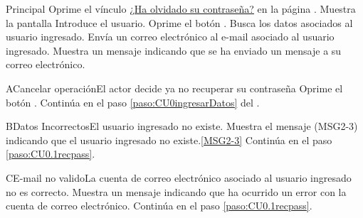	\begin{UCtrayectoria}{Principal}
			\UCpaso[\UCactor] Oprime el vínculo \underline{¿Ha olvidado su contraseña?} en la página .
			\UCpaso Muestra la pantalla 	
			\UCpaso [\UCactor] Introduce el usuario.\label{paso:CU0.1recpass}
			\UCpaso [\UCactor] Oprime el botón .
			\UCpaso Busca los datos asociados al usuario ingresado.
			\UCpaso Envía un correo electrónico al e-mail asociado al usuario ingresado.
			\UCpaso Muestra un mensaje indicando que se ha enviado un mensaje a su correo electrónico.
	\end{UCtrayectoria}

		\begin{UCtrayectoriaA}{A}{Cancelar operación}{El actor decide ya no recuperar su contraseña}
			\UCpaso[\UCactor] Oprime el botón .
			\UCpaso Continúa en el paso \ref{paso:CU0ingresarDatos} del .
		\end{UCtrayectoriaA}

		\begin{UCtrayectoriaA}{B}{Datos Incorrectos}{El usuario ingresado no existe.}
			\UCpaso Muestra el mensaje (MSG2-3) indicando que el usuario ingresado no existe.\ref{MSG2-3}
			\UCpaso Continúa en el paso \ref{paso:CU0.1recpass}.
		\end{UCtrayectoriaA}

		\begin{UCtrayectoriaA}{C}{E-mail no valido}{La cuenta de correo electrónico asociado al usuario ingresado no es correcto.}
			\UCpaso Muestra un mensaje indicando que ha ocurrido un error con la cuenta de correo electrónico.
			\UCpaso Continúa en el paso \ref{paso:CU0.1recpass}.
		\end{UCtrayectoriaA}